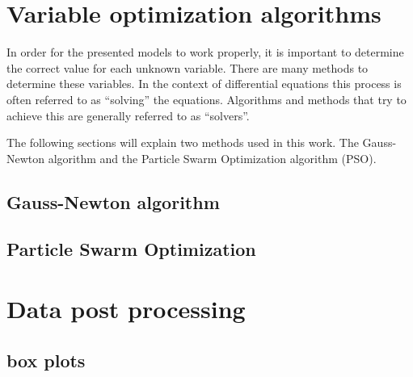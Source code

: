 
\section{Variable optimization algorithms}
In order for the presented models to work properly, it is important to determine the correct value for each unknown variable. There are many
methods to determine these variables. In the context of differential equations this process is often referred to as ``solving'' the equations.
Algorithms and methods that try to achieve this are generally referred to as ``solvers''.\newline

\par
The following sections will explain two methods used in this work. The Gauss-Newton algorithm and the Particle Swarm Optimization algorithm (PSO).


\subsection{Gauss-Newton algorithm}
\label{sec:Gauss}


\subsection{Particle Swarm Optimization}
\label{sec:PSO}






\section{Data post processing}

\subsection{box plots}

